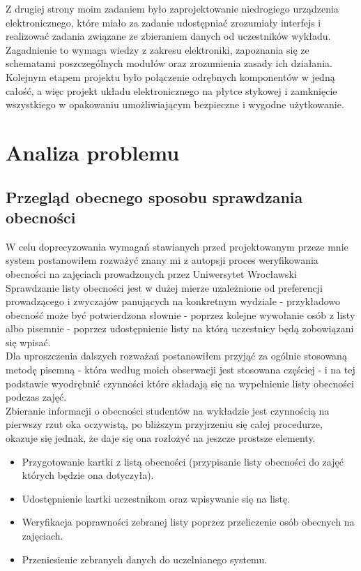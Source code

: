 \documentclass[declaration,shortabstract, mgr]{iithesis}
\begin{document}
\indent Z drugiej strony moim zadaniem było zaprojektowanie niedrogiego urządzenia elektronicznego, które miało za zadanie udostępniać zrozumiały interfejs i realizować zadania związane ze zbieraniem danych od uczestników wykładu. Zagadnienie to wymaga wiedzy z zakresu elektroniki, zapoznania się ze schematami poszczególnych modułów oraz zrozumienia zasady ich działania. Kolejnym etapem projektu było połączenie odrębnych komponentów w jedną całość, a więc projekt układu elektronicznego na płytce stykowej i zamknięcie wszystkiego w opakowaniu umożliwiającym bezpieczne i wygodne użytkowanie.


\chapter{Analiza problemu}
\section{Przegląd obecnego sposobu sprawdzania obecności}
\indent W celu doprecyzowania wymagań stawianych przed projektowanym przeze mnie system postanowiłem rozważyć znany mi z autopsji proces weryfikowania obecności na zajęciach prowadzonych przez Uniwersytet Wrocławski\\
\indent Sprawdzanie listy obecności jest w dużej mierze uzależnione od preferencji prowadzącego i zwyczajów panujących na konkretnym wydziale - przykładowo obecność może być potwierdzona słownie - poprzez kolejne wywołanie osób z listy albo pisemnie - poprzez udostępnienie listy na którą uczestnicy będą zobowiązani się wpisać.\\
\indent Dla uproszczenia dalszych rozważań postanowiłem przyjąć za ogólnie stosowaną metodę pisemną - która według moich obserwacji jest stosowana częściej - i na tej podstawie wyodrębnić czynności które składają się na wypełnienie listy obecności podczas zajęć.\\
\indent Zbieranie informacji o obecności studentów na wykładzie jest czynnością na pierwszy rzut oka oczywistą, po bliższym przyjrzeniu się całej procedurze, okazuje się jednak, że daje się ona rozłożyć na jeszcze prostsze elementy. \\

\begin{itemize}
\item Przygotowanie kartki z listą obecności (przypisanie listy obecności do zajęć których będzie ona dotyczyła).
\item Udostępnienie kartki uczestnikom oraz wpisywanie się na listę.
\item Weryfikacja poprawności zebranej listy poprzez przeliczenie osób obecnych na zajęciach.
\item Przeniesienie zebranych danych do uczelnianego systemu.
\end{itemize}
\end{document}

